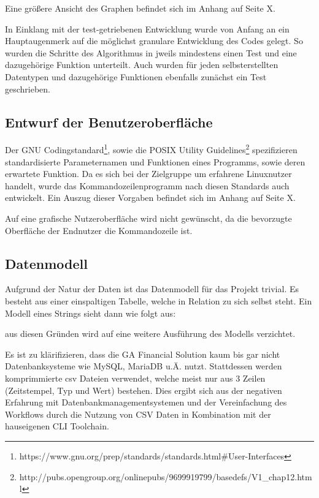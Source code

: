 Eine größere Ansicht des Graphen befindet sich im Anhang auf Seite X.


In Einklang mit der test-getriebenen Entwicklung wurde von Anfang an ein Hauptaugenmerk
auf die möglichst granulare Entwicklung des Codes gelegt. So wurden die Schritte
des Algorithmus in jweils mindestens einen Test und eine dazugehörige Funktion unterteilt.
Auch wurden für jeden selbsterstellten Datentypen und dazugehörige Funktionen
ebenfalls zunächst ein Test geschrieben.

\subsection{Entwurf der Benutzeroberfläche}
Der GNU Codingstandard\footnote{https://www.gnu.org/prep/standards/standards.html#User-Interfaces},
sowie die POSIX Utility Guidelines\footnote{http://pubs.opengroup.org/onlinepubs/9699919799/basedefs/V1_chap12.html}
spezifizieren standardisierte Parameternamen und Funktionen eines Programms, sowie
deren erwartete Funktion. Da es sich bei der Zielgruppe um erfahrene Linuxnutzer handelt, wurde das
Kommandozeilenprogramm nach diesen Standards auch entwickelt. Ein Auszug dieser
Vorgaben befindet sich im Anhang auf Seite X.\par

Auf eine grafische Nutzeroberfläche wird nicht gewünscht, da die bevorzugte
Oberfläche der Endnutzer die Kommandozeile ist.

\subsection{Datenmodell}
Aufgrund der Natur der Daten ist das Datenmodell für das Projekt trivial. Es besteht aus einer
einspaltigen Tabelle, welche in Relation zu sich selbst steht. Ein Modell eines Strings sieht dann wie folgt aus:

aus diesen Gründen wird auf eine weitere Ausführung des Modells verzichtet.

Es ist zu klärifizieren, dass die GA Financial Solution kaum bis gar nicht Datenbanksysteme wie
MySQL, MariaDB u.Ä. nutzt. Stattdessen werden komprimmierte csv Dateien verwendet, welche
meist nur aus 3 Zeilen (Zeitstempel, Typ und Wert) bestehen. Dies ergibt sich aus
der negativen Erfahrung mit Datenbankmanagementsystemen und der Vereinfachung des Workflows durch
die Nutzung von CSV Daten in Kombination mit der hauseigenen CLI Toolchain.


